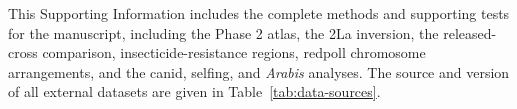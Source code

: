 \begingroup{}\endgroup%
This Supporting Information includes the complete methods and supporting tests for the manuscript, including the Phase 2 atlas, the 2La inversion, the released-cross comparison, insecticide-resistance regions, redpoll chromosome arrangements, and the canid, selfing, and \textit{Arabis} analyses. The source and version of all external datasets are given in Table~\ref{tab:data-sources}.
